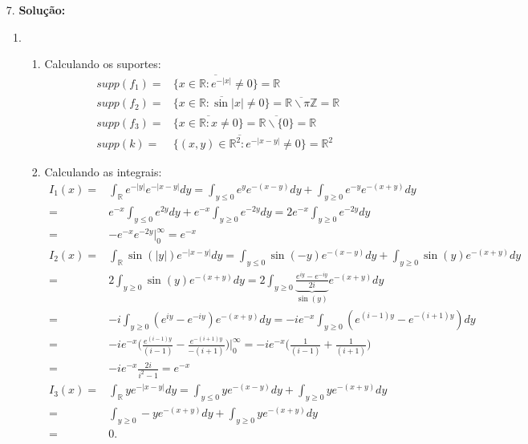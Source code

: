 \documentclass{article}
\begin{document}
\begin{enumerate}
		\item[7.] \textbf{Solução:} 
			\begin{enumerate}
				\item 
				\begin{enumerate}
					\item Calculando os suportes:
					$$
					\begin{aligned}
					supp(f_{1}) = & \overline{ \{x \in \mathbb{R}: e^{-|x|} \neq 0\} } = \mathbb{R} \\ 
					supp(f_{2}) = & \overline{ \{x \in \mathbb{R}: \sin{|x|} \neq 0\} } = \overline{\mathbb{R} \backslash \pi \mathbb{Z} } = \mathbb{R}\\ 
					supp(f_{3}) = & \overline{ \{x \in \mathbb{R}: x \neq 0\} } = \overline{ \mathbb{R}\backslash \{0\} } = \mathbb{R} \\
					supp(k) = & \overline{ \{(x,y) \in \mathbb{R}^{2}: e^{-|x-y|} \neq 0\} } = \mathbb{R}^{2}
					\end{aligned}
					$$
					
					\item Calculando as integrais:
					$$
					\begin{aligned}
						I_{1}(x) 
						= & \int_{\mathbb{R}}e^{-|y|}e^{-|x-y|} dy = \int_{y \leq 0 }e^{y}e^{-(x-y)} dy + \int_{y \geq 0 }e^{-y}e^{-(x+y)} dy \\
						= & e^{-x}\int_{y \leq 0 }e^{2y} dy + e^{-x}\int_{y \geq 0 }e^{-2y} dy = 2e^{-x}\int_{y \geq 0 }e^{-2y} dy \\
						= & -e^{-x}e^{-2y}\Big|^{\infty}_{0} = e^{-x} \\
						I_{2}(x) 
						= & \int_{\mathbb{R}}\sin(|y|)e^{-|x-y|} dy = \int_{y \leq 0 }\sin(-y)e^{-(x-y)} dy + \int_{y \geq 0 }\sin(y)e^{-(x+y)} dy \\
						= & 2 \int_{y \geq 0 }\sin(y)e^{-(x+y)} dy = 2 \int_{y \geq 0 } \underbrace{\frac{e^{iy} - e^{-iy}}{2i}}_{\sin(y)} e^{-(x+y)} dy \\
						= & -i\int_{y \geq 0 }(e^{iy} - e^{-iy})e^{-(x+y)} dy = -ie^{-x}\int_{y \geq 0 }(e^{(i-1)y} - e^{-(i+1)y})dy \\
						=  & -ie^{-x}\Big( \frac{e^{(i-1)y}}{(i-1)} - \frac{e^{-(i+1)y}}{-(i+1)} \Big) \Big|^{\infty}_{0} = -ie^{-x}\Big( \frac{1}{(i-1)} + \frac{1}{(i+1)} \Big) \\
						= & -ie^{-x} \frac{2i}{i^{2} - 1} = e^{-x} \\
						I_{3}(x)
						= & \int_{\mathbb{R}} y e^{-|x-y|} dy = \int_{y \leq 0 }ye^{-(x-y)} dy + \int_{y \geq 0 }ye^{-(x+y)} dy \\
						= & \int_{y \geq 0 }-ye^{-(x+y)} dy + \int_{y \geq 0 }ye^{-(x+y)} dy \\
						= & 0.
					\end{aligned}
					$$
				\end{enumerate}
			\end{enumerate}
	\end{enumerate}
		
\end{document}
